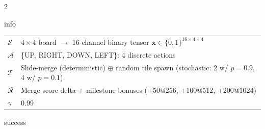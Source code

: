 \documentclass[a4paper,11pt]{article}
\begin{document}
\begin{multicols}{2}
\begin{sectionbox}{info}
\vspace{2pt}
\renewcommand{\arraystretch}{1.25}
{\small
\begin{tabularx}{\linewidth}{@{}>{\bfseries\color{info}}l X@{}}
$\mathcal{S}$ & $4{\times}4$ board $\to$ 16-channel binary tensor $\mathbf{x} \in \{0,1\}^{16 \times 4 \times 4}$ \\
$\mathcal{A}$ & \{UP, RIGHT, DOWN, LEFT\}: 4 discrete actions \\
$\mathcal{T}$ & Slide-merge (deterministic) $\oplus$ random tile spawn (stochastic: 2 w/ $p{=}0.9$, 4 w/ $p{=}0.1$) \\
$\mathcal{R}$ & Merge score delta + milestone bonuses (+50@256, +100@512, +200@1024) \\
$\gamma$ & 0.99 \\
\end{tabularx}
}
\end{sectionbox}

\begin{sectionbox}{success}


\end{sectionbox}
\end{multicols}
\end{document}
